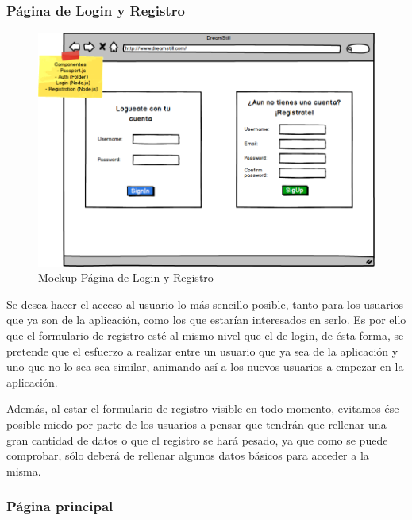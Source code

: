 \documentclass[11pt,openany]{book}
\begin{document}
\subsubsection{Página de Login y Registro}

\begin{figure}[H]
\centering
\includegraphics[totalheight=6.5cm]{mockups/LoginPage.png}
\caption{Mockup Página de Login y Registro}
\end{figure}
\par\bigskip 
\noindent

Se desea hacer el acceso al usuario lo más sencillo posible, tanto para los usuarios que ya son de la aplicación, como los que estarían interesados en serlo. Es por ello que el formulario de registro esté al mismo nivel que el de login, de ésta forma, se pretende que el esfuerzo a realizar entre un usuario que ya sea de la aplicación y uno que no lo sea sea similar, animando así a los nuevos usuarios a empezar en la aplicación. 

Además, al estar el formulario de registro visible en todo momento, evitamos ése posible miedo por parte de los usuarios a pensar que tendrán que rellenar una gran cantidad de datos o que el registro se hará pesado, ya que como se puede comprobar, sólo deberá de rellenar algunos datos básicos para acceder a la misma.

\subsubsection{Página principal}
\end{document}
